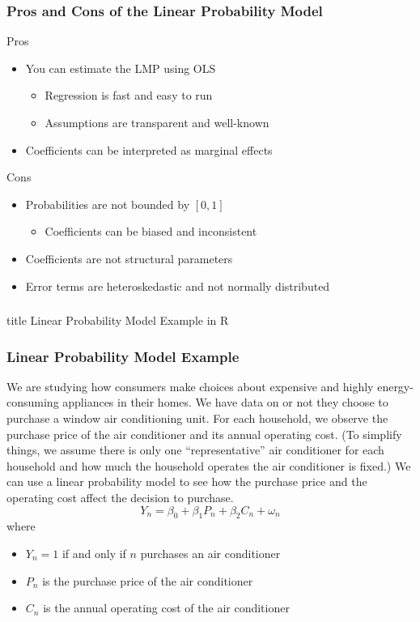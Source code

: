\documentclass{beamer}
\begin{document}
\begin{frame}\frametitle{Pros and Cons of the Linear Probability Model}
    Pros
    \begin{itemize}
    	\item You can estimate the LMP using OLS
    	\begin{itemize}
    		\item Regression is fast and easy to run
    		\item Assumptions are transparent and well-known
    	\end{itemize}
    	\item Coefficients can be interpreted as marginal effects
    \end{itemize}
    \vspace{3ex}
    Cons
    \begin{itemize}
    	\item Probabilities are not bounded by $[0, 1]$
    	\begin{itemize}
    		\item Coefficients can be biased and inconsistent
    	\end{itemize}
    	\item Coefficients are not structural parameters
    	\item Error terms are heteroskedastic and not normally distributed
    \end{itemize}
\end{frame}

\begin{frame}\frametitle{}
    \vfill
    \centering
    \begin{beamercolorbox}[center]{title}
        \Large Linear Probability Model Example in R
    \end{beamercolorbox}
    \vfill
\end{frame}

\begin{frame}\frametitle{Linear Probability Model Example}
    We are studying how consumers make choices about expensive and highly energy-consuming appliances in their homes. We have data on  or not they choose to purchase a window air conditioning unit. For each household, we observe the purchase price of the air conditioner and its annual operating cost. (To simplify things, we assume there is only one ``representative'' air conditioner for each household and how much the household operates the air conditioner is fixed.) We can use a linear probability model to see how the purchase price and the operating cost affect the decision to purchase.
    $$Y_n = \beta_0 + \beta_1 P_n + \beta_2 C_n + \omega_n$$
    where
    \begin{itemize}
    	\item $Y_n = 1$ if and only if $n$ purchases an air conditioner
    	\item $P_n$ is the purchase price of the air conditioner
    	\item $C_n$ is the annual operating cost of the air conditioner
    \end{itemize}
\end{frame}
\end{document}
